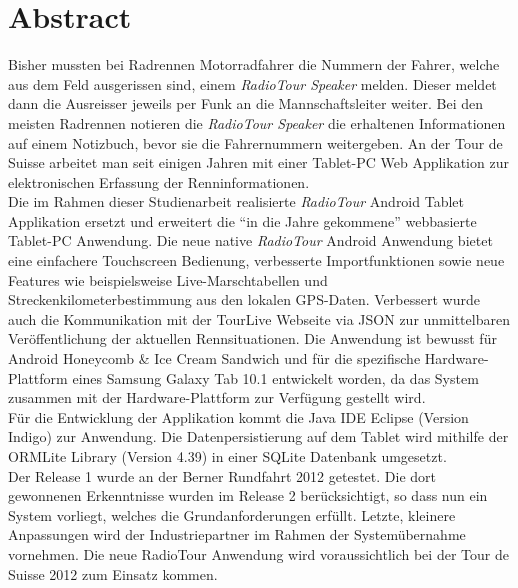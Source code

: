 \chapter*{Abstract}


Bisher mussten bei Radrennen Motorradfahrer die Nummern der Fahrer, welche aus dem Feld ausgerissen sind, einem \textit{RadioTour Speaker} melden. Dieser meldet dann die Ausreisser jeweils per Funk an die Mannschaftsleiter weiter. Bei den meisten Radrennen notieren die \textit{RadioTour Speaker} die erhaltenen Informationen auf einem Notizbuch, bevor sie die Fahrernummern weitergeben. An der Tour de Suisse arbeitet man seit einigen Jahren mit einer Tablet-PC Web Applikation zur elektronischen Erfassung der Renninformationen.
\\
Die im Rahmen dieser Studienarbeit realisierte \textit{RadioTour} Android Tablet Applikation ersetzt und erweitert die "`in die Jahre gekommene"' webbasierte Tablet-PC Anwendung. Die neue native \textit{RadioTour} Android Anwendung bietet eine einfachere Touchscreen Bedienung, verbesserte Importfunktionen sowie neue Features wie beispielsweise Live-Marschtabellen und Streckenkilometerbestimmung aus den lokalen GPS-Daten. Verbessert wurde auch die Kommunikation mit der TourLive Webseite via JSON zur unmittelbaren Veröffentlichung der aktuellen Rennsituationen. Die Anwendung ist bewusst für Android Honeycomb \& Ice Cream Sandwich und für die  spezifische Hardware-Plattform eines Samsung Galaxy Tab 10.1 entwickelt worden, da das System zusammen mit der Hardware-Plattform zur Verfügung gestellt wird.
\\
Für die Entwicklung der Applikation kommt die Java IDE Eclipse (Version Indigo) zur Anwendung. Die Datenpersistierung auf dem Tablet wird mithilfe der ORMLite Library (Version 4.39) in einer SQLite Datenbank umgesetzt.
\\
Der Release 1 wurde an der Berner Rundfahrt 2012 getestet. Die dort gewonnenen Erkenntnisse wurden im Release 2 berücksichtigt, so dass nun ein System vorliegt, welches die Grundanforderungen erfüllt. Letzte, kleinere Anpassungen wird der Industriepartner im Rahmen der Systemübernahme vornehmen. Die neue RadioTour Anwendung wird voraussichtlich bei der Tour de Suisse 2012 zum Einsatz kommen.

